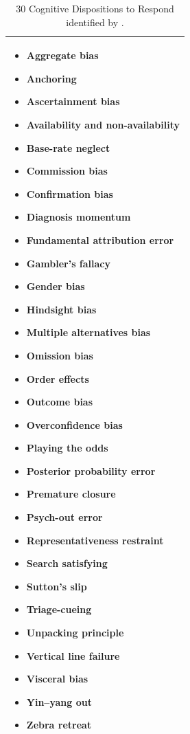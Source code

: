 \documentclass[a4paper]{scrartcl}     %
\begin{document}
      \begin{table}
        \caption{30 Cognitive Dispositions to Respond identified by \citet{Croskerry2002}.}
        \renewcommand{\arraystretch}{0}
        \begin{tabu} to \linewidth {X[1,l]}
          \toprule
          \begin{multicols}{3}
           \begin{itemize}[label={}]
            \item Aggregate bias
            \item Anchoring
            \item Ascertainment bias
            \item Availability and non-availability
            \item Base-rate neglect
            \item Commission bias
            \item Confirmation bias
            \item Diagnosis momentum
            \item Fundamental attribution error
            \item Gambler's fallacy
            \item Gender bias
            \item Hindsight bias
            \item Multiple alternatives bias
            \item Omission bias
            \item Order effects
            \item Outcome bias
            \item Overconfidence bias
            \item Playing the odds
            \item Posterior probability error
            \item Premature closure
            \item Psych-out error
            \item Representativeness restraint
            \item Search satisfying
            \item Sutton's slip
            \item Triage-cueing
            \item Unpacking principle
            \item Vertical line failure
            \item Visceral bias
            \item Yin–yang out
            \item Zebra retreat
          \end{itemize}
          \end{multicols} \\
          \bottomrule
        \end{tabu}
        \label{table:cdrs}
      \end{table}
\end{document}

